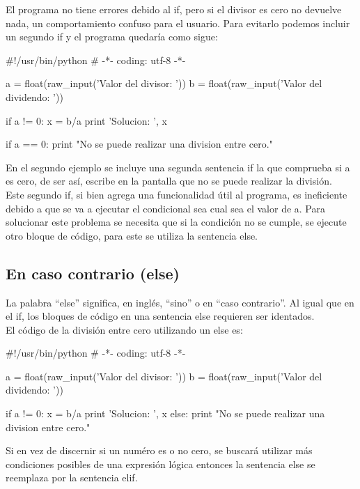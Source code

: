 El programa no tiene errores debido al if, pero si el divisor es cero no devuelve nada, un comportamiento confuso para el usuario. Para evitarlo podemos incluir un segundo if y el programa quedaría como sigue:\\

\begin{pyglist} [language=python]
#!/usr/bin/python
# -*- coding: utf-8 -*-

a = float(raw_input('Valor del divisor: '))
b = float(raw_input('Valor del dividendo: '))

if a != 0:
    x = b/a
    print 'Solucion: ', x

if a == 0:
    print "No se puede realizar una division entre cero."
\end{pyglist}

En el segundo ejemplo se incluye una segunda sentencia if la que comprueba si a es cero, de ser así, escribe en la pantalla que no se puede realizar la división.\\

Este segundo if, si bien agrega una funcionalidad útil al programa, es ineficiente debido a que se va a ejecutar el condicional sea cual sea el valor de a. Para solucionar este problema se necesita que si la condición no se cumple, se ejecute otro bloque de código, para este se utiliza la sentencia else.

\subsection{En caso contrario (else)}

La palabra ``else'' significa, en inglés, ``sino'' o en ``caso contrario''. Al igual que en el if, los bloques de código en una sentencia else requieren ser identados.\\

El código de la división entre cero utilizando un else es:\\

\begin{pyglist} [language=python]
#!/usr/bin/python
# -*- coding: utf-8 -*-

a = float(raw_input('Valor del divisor: '))
b = float(raw_input('Valor del dividendo: '))

if a != 0:
    x = b/a
    print 'Solucion: ', x
else:
    print "No se puede realizar una division entre cero."
\end{pyglist}

Si en vez de discernir si un numéro es o no cero, se buscará utilizar más condiciones posibles de una expresión lógica entonces la sentencia else se reemplaza por la sentencia elif.


